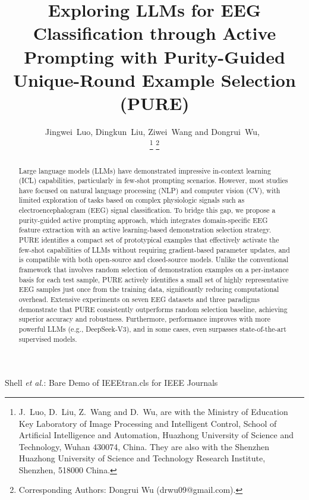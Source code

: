 \documentclass[journal,twocolumn]{IEEEtran}
\begin{document}
\title{Exploring LLMs for EEG Classification through Active Prompting with Purity-Guided Unique-Round Example Selection (PURE)}

\author{Jingwei~Luo, Dingkun~Liu, Ziwei~Wang and Dongrui~Wu,~

\thanks{J.~Luo, D.~Liu, Z.~Wang and D.~Wu, are with the Ministry of Education Key Laboratory of Image Processing and Intelligent Control, School of Artificial Intelligence and Automation, Huazhong University of Science and Technology, Wuhan 430074, China. They are also with the Shenzhen Huazhong University of Science and Technology Research Institute, Shenzhen, 518000 China.}
\thanks{Corresponding Authors: Dongrui Wu (drwu09@gmail.com).}
}
\markboth{}%
{Shell \MakeLowercase{\textit{et al.}}: Bare Demo of IEEEtran.cls for IEEE Journals}
\maketitle

\begin{abstract}
  Large language models (LLMs) have demonstrated impressive in-context learning (ICL) capabilities, particularly in few-shot prompting scenarios. However, most studies have focused on natural language processing (NLP) and computer vision (CV), with limited exploration of tasks based on complex physiologic signals such as electroencephalogram (EEG) signal classification.
  To bridge this gap, we propose a purity-guided active prompting approach, which integrates domain-specific EEG feature extraction with an active learning-based demonstration selection strategy. PURE identifies a compact set of prototypical examples that effectively activate the few-shot capabilities of LLMs without requiring gradient-based parameter updates, and is compatible with both open-source and closed-source models.
  Unlike the conventional framework that involves random selection of demonstration examples on a per-instance basis for each test sample, PURE actively identifies a small set of highly representative EEG samples just once from the training data, significantly reducing computational overhead.
  Extensive experiments on seven EEG datasets and three paradigms demonstrate that PURE consistently outperforms random selection baseline, achieving superior accuracy and robustness. Furthermore, performance improves with more powerful LLMs (e.g., DeepSeek-V3), and in some cases, even surpasses state-of-the-art supervised models.
\end{abstract}
\end{document}
